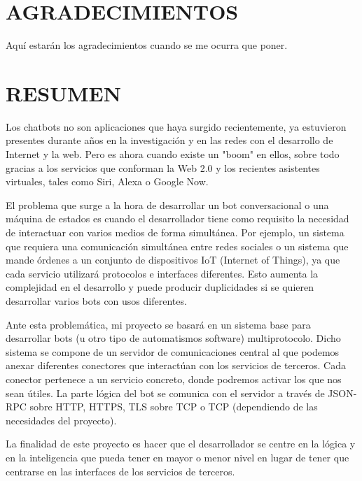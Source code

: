 \documentclass[spanish,12pt, a4paper, twoside]{paper}
\let\oldsection\section
\def\section{\cleardoublepage\oldsection}
\newcommand\blankpage{%
    \null
    \thispagestyle{empty}%
    \addtocounter{page}{-1}%
    \newpage}
\begin{document}
\afterpage{\blankpage}


\section*{AGRADECIMIENTOS}
Aquí estarán los agradecimientos cuando se me ocurra que poner.

\section*{RESUMEN}
Los chatbots no son aplicaciones que haya surgido recientemente, ya estuvieron presentes durante años en la investigación y en las redes con el desarrollo de Internet y la web. Pero es ahora cuando existe un "boom" en ellos, sobre todo gracias a los servicios que conforman la Web 2.0 y los recientes asistentes virtuales, tales como Siri, Alexa o Google Now.
\newline

El problema que surge a la hora de desarrollar un bot conversacional o una máquina de estados es cuando el desarrollador tiene como requisito la necesidad de interactuar con varios medios de forma simultánea. Por ejemplo, un sistema que requiera una comunicación simultánea entre redes sociales o un sistema que mande órdenes a un conjunto de dispositivos IoT (Internet of Things), ya que cada servicio utilizará protocolos e interfaces diferentes. Esto aumenta la complejidad en el desarrollo y puede producir duplicidades si se quieren desarrollar varios bots con usos diferentes.
\newline

Ante esta problemática, mi proyecto se basará en un sistema base para desarrollar bots (u otro tipo de automatismos software) multiprotocolo. Dicho sistema se compone de un servidor de comunicaciones central al que podemos anexar diferentes conectores que interactúan con los servicios de terceros. Cada conector pertenece a un servicio concreto, donde podremos activar los que nos sean útiles. La parte lógica del bot se comunica con el servidor a través de JSON-RPC sobre HTTP, HTTPS, TLS sobre TCP o TCP (dependiendo de las necesidades del proyecto).
\newline

La finalidad de este proyecto es hacer que el desarrollador se centre en la lógica y en la inteligencia que pueda tener en mayor o menor nivel en lugar de tener que centrarse en las interfaces de los servicios de terceros.
\end{document}
